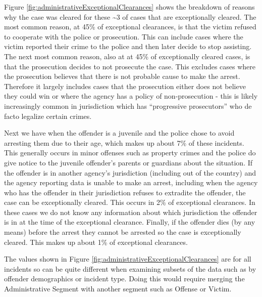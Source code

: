 \documentclass[
]{krantz}
\begin{document}
Figure \ref{fig:administrativeExceptionalClearances} shows
the breakdown of reasons why the case was cleared for these
\textasciitilde3 of cases that are exceptionally cleared.
The most common reason, at 45\% of exceptional clearances,
is that the victim refused to cooperate with the police or
prosecution. This can include cases where the victim
reported their crime to the police and then later decide to
stop assisting. The next most common reason, also at at 45\%
of exceptionally cleared cases, is that the prosecution
decides to not prosecute the case. This excludes cases where
the prosecution believes that there is not probable cause to
make the arrest. Therefore it largely includes cases that
the prosecution either does not believe they could win or
where the agency has a policy of non-prosecution - this is
likely increasingly common in jurisdiction which has
``progressive prosecutors'' who de facto legalize certain
crimes.

Next we have when the offender is a juvenile and the police
chose to avoid arresting them due to their age, which makes
up about 7\% of these incidents. This generally occurs in
minor offenses such as property crimes and the police do
give notice to the juvenile offender's parents or guardians
about the situation. If the offender is in another agency's
jurisdiction (including out of the country) and the agency
reporting data is unable to make an arrest, including when
the agency who has the offender in their jurisdiction
refuses to extradite the offender, the case can be
exceptionally cleared. This occurs in 2\% of exceptional
clearances. In these cases we do not know any information
about which jurisdiction the offender is in at the time of
the exceptional clearance. Finally, if the offender dies (by
any means) before the arrest they cannot be arrested so the
case is exceptionally cleared. This makes up about 1\% of
exceptional clearances.

The values shown in Figure
\ref{fig:administrativeExceptionalClearances} are for all
incidents so can be quite different when examining subsets
of the data such as by offender demographics or incident
type. Doing this would require merging the Administrative
Segment with another segment such as Offense or Victim.
\end{document}
